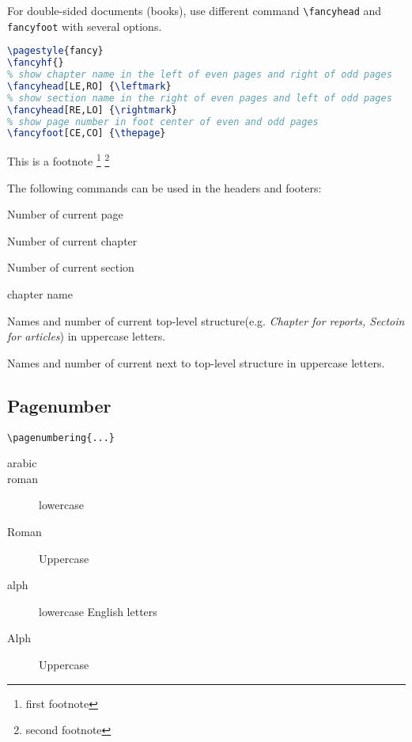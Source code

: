 For double-sided documents (books), use different command \verb|\fancyhead|
and \verb|fancyfoot| with several options.
\begin{lstlisting}[language=TeX]
\pagestyle{fancy}
\fancyhf{}
% show chapter name in the left of even pages and right of odd pages
\fancyhead[LE,RO] {\leftmark} 
% show section name in the right of even pages and left of odd pages
\fancyhead[RE,LO] {\rightmark} 
% show page number in foot center of even and odd pages
\fancyfoot[CE,CO] {\thepage}	
\end{lstlisting}




This is a footnote \footnote[1]{first footnote} \footnote[2]{second footnote}

The following commands can be used in the headers and footers:
\begin{description}[style=nextline]
    \item [\textbackslash{thepage}] Number of current page
    \item [\textbackslash{thechapter}] Number of current chapter
    \item [\textbackslash{thesection}] Number of current section
    \item [\textbackslash{chaptername}] chapter name
    \item [\textbackslash{leftmark}] Names and number of current top-level
	structure(e.g. \textit{Chapter for reports, Sectoin for articles})
	in uppercase letters.
    \item [\textbackslash{rightmark}] Names and number of current next to 
	top-level structure in uppercase letters.
\end{description}

\subsection{Pagenumber}
\verb|\pagenumbering{...}|
\begin{description}
    \item [arabic]
    \item [roman]   lowercase
    \item [Roman]   Uppercase
    \item [alph]    lowercase English letters
    \item [Alph]    Uppercase
\end{description}

